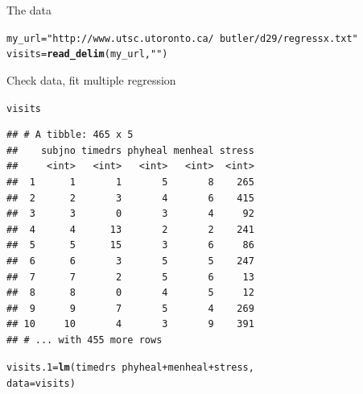 \documentclass[unknownkeysallowed]{beamer}\usepackage[]{graphicx}\usepackage[]{color}
\makeatletter
\newcommand{\hlstr}[1]{\textcolor[rgb]{0.192,0.494,0.8}{#1}}%
\newcommand{\hlopt}[1]{\textcolor[rgb]{0,0,0}{#1}}%
\newcommand{\hlstd}[1]{\textcolor[rgb]{0.345,0.345,0.345}{#1}}%
\newcommand{\hlkwb}[1]{\textcolor[rgb]{0.69,0.353,0.396}{#1}}%
\newcommand{\hlkwc}[1]{\textcolor[rgb]{0.333,0.667,0.333}{#1}}%
\newcommand{\hlkwd}[1]{\textcolor[rgb]{0.737,0.353,0.396}{\textbf{#1}}}%
\newenvironment{kframe}{%
 \def\at@end@of@kframe{}%
 \ifinner\ifhmode%
  \def\at@end@of@kframe{\end{minipage}}%
  \begin{minipage}{\columnwidth}%
 \fi\fi%
 \def\FrameCommand##1{\hskip\@totalleftmargin \hskip-\fboxsep
 \colorbox{shadecolor}{##1}\hskip-\fboxsep
     \hskip-\linewidth \hskip-\@totalleftmargin \hskip\columnwidth}%
 \MakeFramed {\advance\hsize-\width
   \@totalleftmargin\z@ \linewidth\hsize
   \@setminipage}}%
 {\par\unskip\endMakeFramed%
 \at@end@of@kframe}
\newenvironment{knitrout}{}{} %
\makeatother
\begin{document}
\begin{frame}[fragile]{The data}

 
\begin{knitrout}
\color{fgcolor}\begin{kframe}
\begin{alltt}
\hlstd{my_url}\hlkwb{=}\hlstr{"http://www.utsc.utoronto.ca/~butler/d29/regressx.txt"}
\hlstd{visits}\hlkwb{=}\hlkwd{read_delim}\hlstd{(my_url,}\hlstr{" "}\hlstd{)}
\end{alltt}


{\ttfamily\noindent\itshape\color{messagecolor}{\#\# Parsed with column specification:\\\#\# cols(\\\#\#\ \  subjno = col\_integer(),\\\#\#\ \  timedrs = col\_integer(),\\\#\#\ \  phyheal = col\_integer(),\\\#\#\ \  menheal = col\_integer(),\\\#\#\ \  stress = col\_integer()\\\#\# )}}\end{kframe}
\end{knitrout}
  


\end{frame}

\begin{frame}[fragile]{Check data, fit multiple regression}
  
\begin{knitrout}\small
{}\color{fgcolor}\begin{kframe}
\begin{alltt}
\hlstd{visits}
\end{alltt}
\begin{verbatim}
## # A tibble: 465 x 5
##    subjno timedrs phyheal menheal stress
##     <int>   <int>   <int>   <int>  <int>
##  1      1       1       5       8    265
##  2      2       3       4       6    415
##  3      3       0       3       4     92
##  4      4      13       2       2    241
##  5      5      15       3       6     86
##  6      6       3       5       5    247
##  7      7       2       5       6     13
##  8      8       0       4       5     12
##  9      9       7       5       4    269
## 10     10       4       3       9    391
## # ... with 455 more rows
\end{verbatim}
\begin{alltt}
\hlstd{visits.1}\hlkwb{=}\hlkwd{lm}\hlstd{(timedrs}\hlopt{~}\hlstd{phyheal}\hlopt{+}\hlstd{menheal}\hlopt{+}\hlstd{stress,}
  \hlkwc{data}\hlstd{=visits)}
\end{alltt}
\end{kframe}
\end{knitrout}
  
\end{frame}
\end{document}
